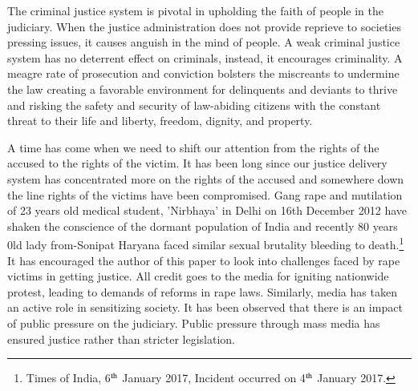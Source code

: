 \setcounter{figure}{0}
\setcounter{table}{0}

\label{2016-art1}

\vspace{-.5cm}


\begin{multicols}{2}


\noi
The criminal justice system is pivotal in upholding the faith of people in the judiciary.
When the justice administration does not provide reprieve to societies pressing issues,
it causes anguish in the mind of people. A weak criminal justice system has no deterrent
effect on criminals, instead, it encourages criminality. A meagre rate of prosecution and
conviction bolsters the miscreants to undermine the law creating a favorable
environment for delinquents and deviants to thrive and risking the safety and security
of law-abiding citizens with the constant threat to their life and liberty, freedom,
dignity, and property.

\noi
A time has come when we need to shift our attention from the rights of the accused to
the rights of the victim. It has been long since our justice delivery system has
concentrated more on the rights of the accused and somewhere down the line rights of
the victims have been compromised. Gang rape and mutilation of 23 years old medical
student, 'Nirbhaya' in Delhi on 16th December 2012 have shaken the conscience of the
dormant population of India and recently 80 years 0ld lady from-Sonipat Haryana faced
similar sexual brutality bleeding to death.\footnote{Times of India, 6$^{\rm th}$ January 2017, Incident occurred on 4$^{\rm th}$ January 2017.}
It has encouraged the author of this paper to
look into challenges faced by rape victims in getting justice. All credit goes to the media
for igniting nationwide protest, leading to demands of reforms in rape laws. Similarly,
media has taken an active role in sensitizing society. It has been observed that there is
an impact of public pressure on the judiciary. Public pressure through mass media has
ensured justice rather than stricter legislation.


\end{multicols}
